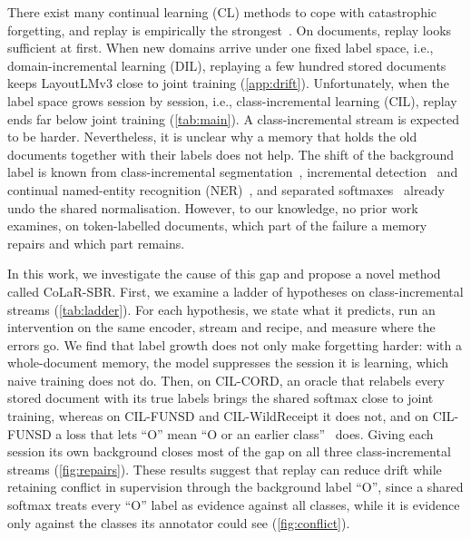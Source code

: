 \documentclass[10pt,twocolumn,letterpaper]{article}
\begin{document}
There exist many continual learning (CL) methods to cope with catastrophic forgetting, and replay is empirically the strongest~\citep{masana2022class,wang2024survey}. On documents, replay looks sufficient at first. When new domains arrive under one fixed label space, i.e., domain-incremental learning (DIL), replaying a few hundred stored documents keeps LayoutLMv3 close to joint training (\cref{app:drift}). Unfortunately, when the label space grows session by session, i.e., class-incremental learning (CIL), replay ends far below joint training (\cref{tab:main}). A class-incremental stream is expected to be harder. Nevertheless, it is unclear why a memory that holds the old documents together with their labels does not help. The shift of the background label is known from class-incremental segmentation~\citep{cermelli2020mib,douillard2021plop}, incremental detection~\citep{liu2023abr,mo2024bpf} and continual named-entity recognition (NER)~\citep{monaikul2021extendner,zhang2023cpfd}, and separated softmaxes~\citep{ahn2021ssil,kim2022more,liu2023ice} already undo the shared normalisation. However, to our knowledge, no prior work examines, on token-labelled documents, which part of the failure a memory repairs and which part remains.



In this work, we investigate the cause of this gap and propose a novel method called CoLaR-SBR. First, we examine a ladder of hypotheses on class-incremental streams (\cref{tab:ladder}). For each hypothesis, we state what it predicts, run an intervention on the same encoder, stream and recipe, and measure where the errors go. We find that label growth does not only make forgetting harder: with a whole-document memory, the model suppresses the session it is learning, which naive training does not do. Then, on CIL-CORD, an oracle that relabels every stored document with its true labels brings the shared softmax close to joint training, whereas on CIL-FUNSD and CIL-WildReceipt it does not, and on CIL-FUNSD a loss that lets ``O'' mean ``O or an earlier class''~\citep{cermelli2020mib} does. Giving each session its own background closes most of the gap on all three class-incremental streams (\cref{fig:repairs}). These results suggest that replay can reduce drift while retaining conflict in supervision through the background label ``O'', since a shared softmax treats every ``O'' label as evidence against all classes, while it is evidence only against the classes its annotator could see (\cref{fig:conflict}).
\end{document}
